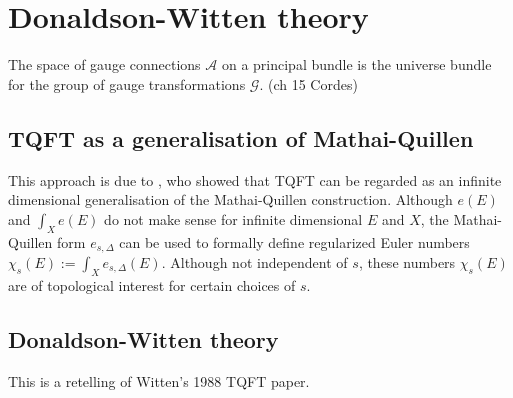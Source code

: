 
\chapter{Donaldson-Witten theory}
\label{chapter4}

The space of gauge connections $\mathcal{A}$ on a principal bundle is the
universe bundle for the group of gauge transformations $\mathcal{G}$. (ch 15
Cordes)

\section{TQFT as a generalisation of Mathai-Quillen}
 This approach is
due to \cite{atiyahlagrangians}, who showed that TQFT can be regarded as an
infinite dimensional generalisation of the Mathai-Quillen construction. 
Although $e(E)$ and  $\int_X e(E)$ do not make sense for
infinite dimensional  $E$ and  $X$, the Mathai-Quillen form  $e_{s,\Delta}$ can
be used to formally define regularized Euler numbers $\chi_s(E) := \int_X
e_{s,\Delta}(E)$. Although not independent of $s$, these numbers  $\chi_s(E)$
are of topological interest for certain choices of  $s$.  


\section{Donaldson-Witten theory}
This is a retelling of Witten's 1988 TQFT paper. 

